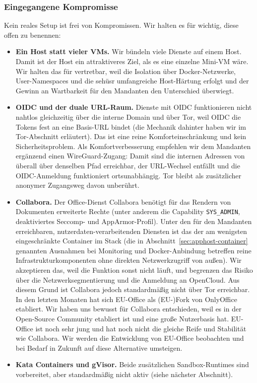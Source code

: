 \subsubsection{Eingegangene Kompromisse}

Kein reales Setup ist frei von Kompromissen. Wir halten es für wichtig, diese
offen zu benennen:

\begin{itemize}
  \item \textbf{Ein Host statt vieler \acp{VM}.} Wir bündeln viele Dienste auf einem
    Host. Damit ist der Host ein attraktiveres Ziel, als es eine einzelne
    Mini-\ac{VM} wäre. Wir halten das für vertretbar, weil die Isolation über
    Docker-Netzwerke, User-Namespaces und die sehüsr umfangreiche Host-Härtung
    erfolgt und der Gewinn an Wartbarkeit für den Mandanten den Unterschied
    überwiegt.
  \item \textbf{\ac{OIDC} und der duale \ac{URL}-Raum.} Dienste mit \ac{OIDC} funktionieren nicht
    nahtlos gleichzeitig über die interne Domain und über Tor, weil \ac{OIDC} die
    Tokens fest an eine Basis-\ac{URL} bindet (die Mechanik dahinter haben wir im
    Tor-Abschnitt erläutert). Das ist eine reine Komforteinschränkung und kein
    Sicherheitsproblem. Als Komfortverbesserung empfehlen wir dem Mandanten
    ergänzend einen WireGuard-Zugang: Damit sind die internen Adressen von
    überall über denselben Pfad erreichbar, der \ac{URL}-Wechsel entfällt und die
    \ac{OIDC}-Anmeldung funktioniert ortsunabhängig. Tor bleibt als zusätzlicher
    anonymer Zugangsweg davon unberührt.
  \item \textbf{Collabora.} Der Office-Dienst Collabora benötigt für das
    Rendern von Dokumenten erweiterte Rechte (unter anderem die Capability
    \texttt{SYS\_ADMIN}, deaktiviertes Seccomp- und AppArmor-Profil). Unter den
    für den Mandanten erreichbaren, nutzerdaten-verarbeitenden Diensten ist das
    der am wenigsten eingeschränkte Container im Stack (die in
    Abschnitt~\ref{sec:apphost-container} genannten Ausnahmen bei Monitoring
    und Docker-Anbindung betreffen reine Infrastrukturkomponenten ohne direkten
    Netzwerkzugriff von außen). Wir akzeptieren das, weil die Funktion sonst nicht läuft, und
    begrenzen das Risiko über die Netzwerksegmentierung und die Anmeldung an OpenCloud. Aus diesem Grund ist Collabora jedoch standardmäßig nicht über Tor erreichbar.
    In den letzten Monaten hat sich \ac{EU}-Office als (\ac{EU}-)Fork von OnlyOffice etabliert. Wir haben uns bewusst für Collabora entschieden, weil es in der Open-Source Community etabliert ist und eine große Nutzerbasis hat. \ac{EU}-Office ist noch sehr jung und hat noch nicht die gleiche Reife und Stabilität wie Collabora. Wir werden die Entwicklung von \ac{EU}-Office beobachten und bei Bedarf in Zukunft auf diese Alternative umsteigen.
  \item \textbf{Kata Containers und gVisor.} Beide zusätzlichen Sandbox-Runtimes
    sind vorbereitet, aber standardmäßig nicht aktiv (siehe nächster
    Abschnitt).
\end{itemize}

